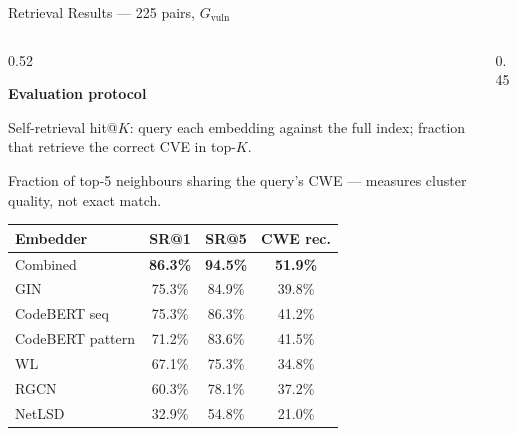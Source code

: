 \documentclass[aspectratio=169,10pt]{beamer}
\begin{document}
\begin{frame}{Retrieval Results — 225 pairs, $G_{\text{vuln}}$}
\begin{columns}[T]
\begin{column}{0.52\textwidth}

  \textbf{Evaluation protocol}\\[3pt]
  \begin{description}
    \item[\textbf{SR@$K$}] Self-retrieval hit@$K$: query each embedding against the full index; fraction that retrieve the correct CVE in top-$K$.
    \item[\textbf{CWE Recall}] Fraction of top-5 neighbours sharing the query's CWE — measures cluster quality, not exact match.
  \end{description}

  \vspace{0.8em}
  {\small
  \renewcommand{\arraystretch}{1}
  \begin{tabular}{lccc}
    \toprule
    \textbf{Embedder} & \textbf{SR@1} & \textbf{SR@5} & \textbf{CWE rec.} \\
    \midrule
    \rowcolor{c1!12}
    Combined          & \textbf{86.3\%} & \textbf{94.5\%} & \textbf{51.9\%} \\
    GIN               & 75.3\%          & 84.9\%          & 39.8\% \\
    CodeBERT seq      & 75.3\%          & 86.3\%          & 41.2\% \\
    CodeBERT pattern  & 71.2\%          & 83.6\%          & 41.5\% \\
    WL                & 67.1\%          & 75.3\%          & 34.8\% \\
    RGCN              & 60.3\%          & 78.1\%          & 37.2\% \\
    NetLSD            & 32.9\%          & 54.8\%          & 21.0\% \\
    \bottomrule
  \end{tabular}}

\end{column}
\begin{column}{0.45\textwidth}


\end{column}
\end{columns}
\end{frame}
\end{document}
